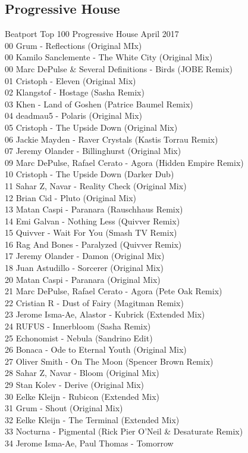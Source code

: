 \begin{multicols}{2}
 \subsection*{Progressive House}
\large Beatport Top 100 Progressive House April 2017 \normalsize\\
 00 Grum - Reflections (Original MIx)\\ 00 Kamilo Sanclemente - The White City (Original Mix)\\ 00 Marc DePulse \& Several Definitions - Birds (JOBE Remix)\\ 01 Cristoph - Eleven (Original Mix)\\ 02 Klangstof - Hostage (Sasha Remix)\\ 03 Khen - Land of Goshen (Patrice Baumel Remix)\\ 04 deadmau5 - Polaris (Original Mix)\\ 05 Cristoph - The Upside Down (Original Mix)\\ 06 Jackie Mayden - Raver Crystals (Kastis Torrau Remix)\\ 07 Jeremy Olander - Billinghurst (Original Mix)\\ 09 Marc DePulse, Rafael Cerato - Agora (Hidden Empire Remix)\\ 10 Cristoph - The Upside Down (Darker Dub)\\ 11 Sahar Z, Navar - Reality Check (Original Mix)\\ 12 Brian Cid - Pluto (Original Mix)\\ 13 Matan Caspi - Paranara (Rauschhaus Remix)\\ 14 Emi Galvan - Nothing Less (Quivver Remix)\\ 15 Quivver - Wait For You (Smash TV Remix)\\ 16 Rag And Bones - Paralyzed (Quivver Remix)\\ 17 Jeremy Olander - Damon (Original Mix)\\ 18 Juan Astudillo - Sorcerer (Original Mix)\\ 20 Matan Caspi - Paranara (Original Mix)\\ 21 Marc DePulse, Rafael Cerato - Agora (Pete Oak Remix)\\ 22 Cristian R - Dust of Fairy (Magitman Remix)\\ 23 Jerome Isma-Ae, Alastor - Kubrick (Extended Mix)\\ 24 RUFUS - Innerbloom (Sasha Remix)\\ 25 Echonomist - Nebula (Sandrino Edit)\\ 26 Bonaca - Ode to Eternal Youth (Original Mix)\\ 27 Oliver Smith - On The Moon (Spencer Brown Remix)\\ 28 Sahar Z, Navar - Bloom (Original Mix)\\ 29 Stan Kolev - Derive (Original Mix)\\ 30 Eelke Kleijn - Rubicon (Extended Mix)\\ 31 Grum - Shout (Original Mix)\\ 32 Eelke Kleijn - The Terminal (Extended Mix)\\ 33 Nocturna - Pigmental (Rick Pier O'Neil \& Desaturate Remix)\\ 34 Jerome Isma-Ae, Paul Thomas - Tomorrow 
\end{multicols}
